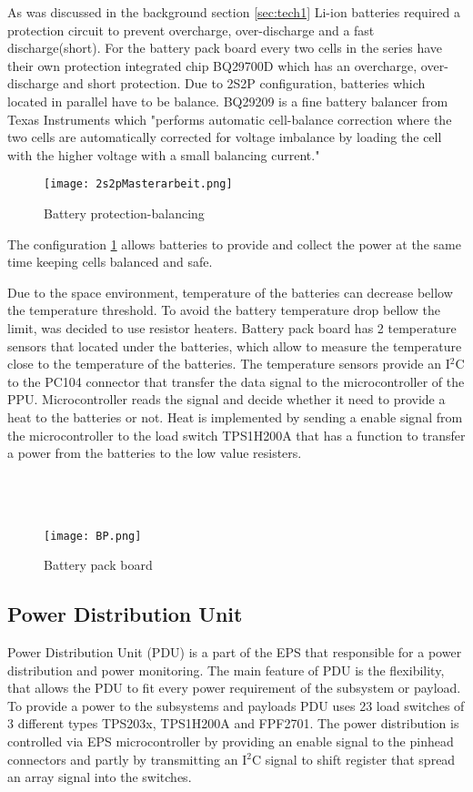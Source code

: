   As was discussed in the background section \ref{sec:tech1} Li-ion batteries required a protection circuit to prevent overcharge, over-discharge and a fast discharge(short). For the battery pack board every two cells in the series have their own protection integrated chip BQ29700D which has an overcharge, over-discharge and short protection. Due to 2S2P configuration, batteries which located in parallel have to be balance. BQ29209 is a fine battery balancer from Texas Instruments which \cite{23}"performs automatic cell-balance correction where the two cells are automatically corrected for voltage imbalance by loading the cell with the higher voltage with a small balancing current."  
  
  \begin{figure}[h]
  	\centering
  	\texttt{[image: 2s2pMasterarbeit.png]}
  	\caption{Battery protection-balancing}
  	\label{fig: Bat_prot_bal}
  \end{figure}
  
  The configuration \ref{fig: Bat_prot_bal} allows batteries to provide and collect the power at the same time keeping cells balanced and safe.
  
  Due to the space environment, temperature of the batteries can decrease bellow the temperature threshold. To avoid the battery temperature drop bellow the limit, was decided to use resistor heaters. Battery pack board has 2 temperature sensors that located under the batteries, which allow to measure the temperature close to the temperature of the batteries. The temperature sensors provide an I$^{2}$C to the PC104 connector that transfer the data signal to the microcontroller of the PPU. Microcontroller reads the signal and decide whether it need to provide a heat to the batteries or not. Heat is implemented by sending a enable signal from the microcontroller to the load switch TPS1H200A that has a function to transfer a power from the batteries to the low value resisters.  \\ \\ \\ \\
  
  
  \begin{figure}[h]
  	\centering
  	\texttt{[image: BP.png]}
  	\caption{Battery pack board}
  	\label{fig: BP}
  \end{figure} 
   
  
  \subsection{Power Distribution Unit}
  Power Distribution Unit (PDU) is a part of the EPS that responsible for a power distribution and power monitoring. The main feature of PDU is the flexibility, that allows the PDU to fit every power requirement of the subsystem or payload.     To provide a power to the subsystems and payloads PDU uses 23 load switches of 3 different types TPS203x, TPS1H200A and FPF2701. The power distribution is controlled via EPS microcontroller by providing an enable signal to the pinhead connectors and partly by transmitting an I$^2$C signal to shift register that spread an array signal into the switches. 
  
